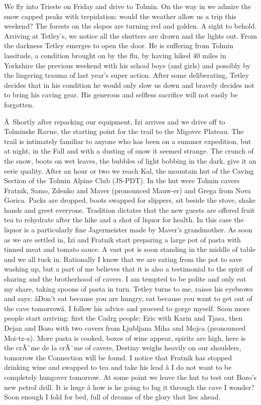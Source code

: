 We fly into Trieste on Friday and drive to Tolmin. On the way in we
admire the snow capped peaks with trepidation: would the weather allow
us a trip this weekend? The forests on the slopes are turning red and
golden. A sight to behold. Arriving at Tetley's, we notice all the
shutters are drawn and the lights out. From the darkness Tetley emerges
to open the door. He is suffering from Tolmin lassitude, a condition
brought on by the flu, by having hiked 40 miles in Yorkshire the
previous weekend with his school boys (and girls) and possibly by the
lingering trauma of last year's super action. After some deliberating,
Tetley decides that in his condition he would only slow us down and
bravely decides not to bring his caving gear. His generous and selfless
sacrifice will not easily be forgotten.

Â~Shortly after repacking our equipment, Izi arrives and we drive off to
Tolminske Ravne, the starting point for the trail to the Migovec
Plateau. The trail is intimately familiar to anyone who has been on a
summer expedition, but at night, in the Fall and with a dusting of snow
it seemed strange. The crunch of the snow, boots on wet leaves, the
bubbles of light bobbing in the dark, give it an eerie quality. After an
hour or two we reach Kal, the mountain hut of the Caving Section of the
Tolmin Alpine Club (JS-PDT). In the hut were Tolmin cavers Fratnik,
Samo, Zdenko and Maver (pronounced Mauw-er) and Grega from Nova Gorica.
Packs are dropped, boots swapped for slippers, sit beside the stove,
shake hands and greet everyone. Tradition dictates that the new guests
are offered fruit tea to rehydrate after the hike and a shot of liquor
for health. In this case the liquor is a particularly fine Jagermeister
made by Maver's grandmother. As soon as we are settled in, Izi and
Fratnik start preparing a large pot of pasta with tinned meat and tomato
sauce. A vast pot is soon standing in the middle of table and we all
tuck in. Rationally I know that we are eating from the pot to save
washing up, but a part of me believes that it is also a testimonial to
the spirit of sharing and the brotherhood of cavers. I am tempted to be
polite and only eat my share, taking spoons of pasta in turn. Tetley
turns to me, raises his eyebrows and says: âDon't eat because you are
hungry, eat because you want to get out of the cave tomorrowâ. I
follow his advice and proceed to gorge myself. Soon more people start
arriving: first the Cadrg people: Eric with Karin and Tjasa, then Dejan
and Bozo with two cavers from Ljubljana Miha and Mojca (pronounced
Moi-tz-a). More pasta is cooked, boxes of wine appear, spirits are high,
here is the crÃ¨me de la crÃ¨me of cavers, Destiny weighs heavily on our
shoulders, tomorrow the Connection will be found. I notice that Fratnik
has stopped drinking wine and swapped to tea and take his lead â I do
not want to be completely hungover tomorrow. At some point we leave the
hut to test out Bozo's new petrol drill. It is huge â how is he going
to lug it through the cave I wonder? Soon enough I fold for bed, full of
dreams of the glory that lies ahead.

